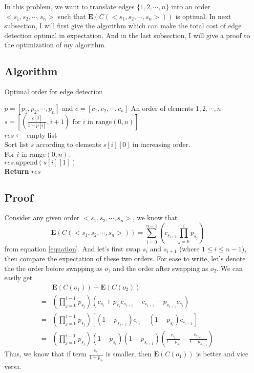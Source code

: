 \documentclass[twoside]{article}
\begin{document}
In this problem, we want to translate edges $\{1,2,\cdots,n\}$ into an order $<s_1,s_2,\cdots,s_n>$ such that $\textbf{E}(C(<s_1,s_2,\cdots,s_n>))$ is optimal. In next subsection, I will first give the algorithm which can make the total cost of edge detection optimal in expectation. And in the last subsection, I will give a proof to the optimization of my algorithm.

\subsection*{Algorithm}
\begin{minipage}{.7\linewidth}
\centering
\begin{algorithm}[H]
    \caption{Optimal order for edge detection}
    \begin{algorithmic}
        \Require $p=[p_1,p_2,\cdots,p_n]$ and $c=[c_1,c_2,\cdots,c_n]$
        \Ensure An order of elements ${1,2,\cdots,n}$ \\
        $s=[(\frac{c[i]}{1-p[i]}, i+1) \text{ for } i \text{ in range}(0,n)]$ \\
        $res\leftarrow$ empty list \\
        Sort list $s$ according to elements $s[i][0]$ in increasing order. \\
        For $i$ in range$(0,n)$: \\
        \quad \quad $res.\text{append}(s[i][1])$ \\
        \textbf{Return} $res$
    \end{algorithmic}
\end{algorithm}
\end{minipage}

\subsection*{Proof}
Consider any given order $<s_1,s_2,\cdots,s_n>$, we know that 
\begin{equation}
    \textbf{E}(C(<s_1,s_2,\cdots,s_n>))=\sum_{i=0}^{n-1}(c_{s_{i+1}}\prod_{j=0}^{i}p_{s_j})
\end{equation}
from equation \ref{equation}. And let's first swap $s_i$ and $s_{i+1}$ (where $1\le i \le n-1$), then compare the expectation of these two orders. For ease to write, let's denote the the order before swapping as $o_1$ and the order after swapping as $o_2$. We can easily get
\begin{equation}
    \begin{aligned}
        &\textbf{E}(C(o_1))-\textbf{E}(C(o_2)) \\
        =& (\prod_{j=0}^{i-1}p_{s_j})(c_{s_i}+p_{s_i}c_{s_{i+1}}-c_{s_{i+1}}-p_{s_{i+1}}c_{s_i}) \\
        =& (\prod_{j=0}^{i-1}p_{s_j})\left[(1-p_{s_{i+1}})c_{s_i}-(1-p_{s_i})c_{s_{i+1}}\right] \\
        =& (\prod_{j=0}^{i-1}p_{s_j})(1-p_{s_i})(1-p_{s_{i+1}})(\frac{c_{s_i}}{1-p_{s_i}}-\frac{c_{s_{i+1}}}{1-p_{s_{i+1}}})
    \end{aligned}
\end{equation}
Thus, we know that if term $\frac{c_{s_i}}{1-p_{s_i}}$ is smaller, then $\textbf{E}(C(o_1))$ is better and vice versa.
\end{document}
